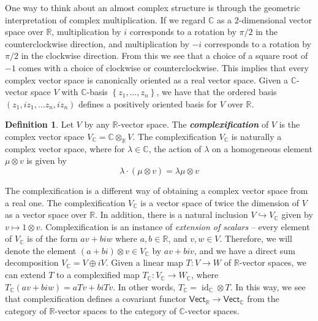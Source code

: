 \documentclass[psamsfonts, 12pt]{amsart}
\theoremstyle{definition}
\newtheorem{defn}[thm]{Definition}
\theoremstyle{remark}
\newcommand{\R}{\mathbb{R}}
\newcommand{\ib}[1]{\textbf{\textit{#1}}}
\newcommand{\C}{\mathbb{C}}
\newcommand{\set}[1]{\left\lbrace #1 \right\rbrace}
\DeclareMathOperator{\id}{id}
\begin{document}
One way to think about an almost complex structure is through the geometric
interpretation of complex multiplication. If we regard $\C$ as a $2$-dimensional vector
space over $\R$, multiplication by $i$ corresponds to a rotation by $\pi/2$ in the
counterclockwise direction, and multiplication by $-i$ corresponds to a rotation by
$\pi/2$ in the clockwise direction. From this we see that a choice of a square root
of $-1$ comes with a choice of clockwise or counterclockwise. This implies that
every complex vector space is canonically oriented as a real vector space. Given a
$\C$-vector space $V$ with $\C$-basis $\set{z_1, \ldots, z_n}$, we have that the ordered
basis $(z_1, iz_1, \ldots z_n, iz_n)$ defines a positively oriented basis for $V$ over
$\R$.
%
\begin{defn}
Let $V$ by any $\R$-vector space. The \ib{complexification} of $V$ is the complex
vector space $V_\C = \C \otimes_\R V$. The complexification $V_\C$ is naturally a
complex vector space, where for $\lambda \in \C$, the action of $\lambda$ on a
homogeneous element $\mu \otimes v$ is given by
\[
\lambda \cdot (\mu \otimes v) = \lambda\mu \otimes v
\]
\end{defn}
%
The complexification is a different way of obtaining a complex vector space from a real
one. The complexification $V_\C$ is a vector space of twice the dimension of $V$ as a
vector space over $\R$. In addition, there is a natural inclusion
$V \hookrightarrow V_\C$ given by $v \mapsto 1 \otimes v$. Complexification is an
instance of \emph{extension of scalars} -- every element of $V_\C$ is of the form
$av + biw$ where $a,b \in \R$, and $v,w \in V$. Therefore, we will denote the element
$(a + bi) \otimes v \in V_\C$ by $av + biv$, and we have a direct sum decomposition
$V_\C = V \oplus iV$.   Given a linear map $T : V \to W$ of $\R$-vector spaces, we can
extend $T$ to a complexified map $T_\C : V_\C \to W_\C$, where
$T_\C(av + biw) = aTv + biTv$. In other words, $T_\C = \id_\C \otimes T$. In this way,
we see that complexification defines a covariant functor
$\mathsf{Vect}_\R \to \mathsf{Vect}_\C$ from the category of $\R$-vector spaces to the
category of $\C$-vector spaces. \\
\end{document}

